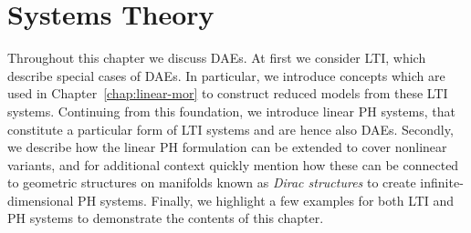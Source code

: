 \chapter{Systems Theory}\label{chap:systems-theory}

Throughout this chapter we discuss \acp{DAE}.
At first we consider \acs{LTI}, which describe special cases of \acp{DAE}.
In particular, we introduce concepts which are used in Chapter~\ref{chap:linear-mor} to construct reduced models from these \ac{LTI} systems.
Continuing from this foundation, we introduce linear \ac{PH} systems, that constitute a particular form of \ac{LTI} systems and are hence also \acp{DAE}.
Secondly, we describe how the linear \ac{PH} formulation can be extended to cover nonlinear variants, and for additional context quickly mention how these can be connected to geometric structures on manifolds known as \emph{Dirac structures} to create infinite-dimensional \ac{PH} systems.
Finally, we highlight a few examples for both \ac{LTI} and \ac{PH} systems to demonstrate the contents of this chapter.




